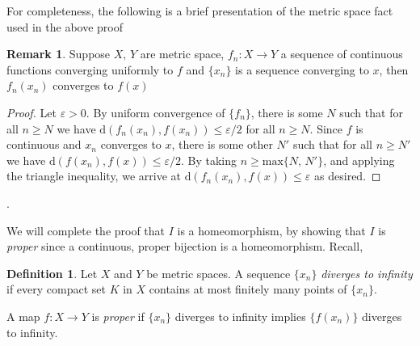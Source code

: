 \documentclass[10pt, oneside]{article}
\theoremstyle{definition}
\newtheorem{defn}{Definition}[section]
\newtheorem{rem}{Remark}[section]
\theoremstyle{definition}
\begin{document}
For completeness, the following is a brief presentation of the metric space fact used in the above proof

\begin{rem}\label{rem:metric_fnxn}
    Suppose $X,\,Y$ are metric space, $f_n: X \to Y$ a sequence of continuous functions converging uniformly to $f$ and $\{x_n\}$ is a sequence converging to $x$, then $f_n(x_n)$ converges to $f(x)$
\end{rem}
\begin{proof}
    Let $\varepsilon>0$. By uniform convergence of $\{f_n\}$, there is some $N$ such that for all $n\geq N$ we have $\text{d}(f_n(x_n), f(x_n)) \leq \varepsilon/2$ for all $n\geq N$. Since $f$ is continuous and $x_n$ converges to $x$, there is some other $N'$ such that for all $n\geq N'$ we have $\text{d}(f(x_n), f(x)) \leq \varepsilon/2$. By taking $n\geq \text{max}\{N,\, N'\}$, and applying the triangle inequality, we arrive at $\text{d}(f_n(x_n), f(x)) \leq \varepsilon$ as desired.
\end{proof}.


We will complete the proof that $I$ is a homeomorphism, by showing that $I$ is {\it proper} since a continuous, proper bijection is a homeomorphism. Recall,
\begin{defn}
    Let $X$ and $Y$ be metric spaces. A sequence $\{x_n\}$ {\it diverges to infinity} if every compact set $K$ in $X$ contains at most finitely many points of $\{x_n\}$.
    
    A map $f:X\to Y$ is {\it proper} if $\{x_n\}$ diverges to infinity implies $\{f(x_n)\}$ diverges to infinity. 
\end{defn}
\end{document}
